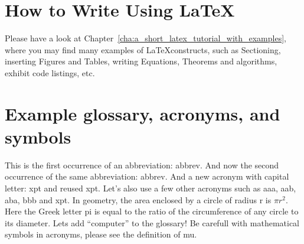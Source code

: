 \section{How to Write Using \LaTeX}
\label{sec:how_to_write_using_latex}

Please have a look at Chapter~\ref{cha:a_short_latex_tutorial_with_examples}, where you may find many examples of \LaTeX constructs, such as Sectioning, inserting Figures and Tables, writing Equations, Theorems and algorithms, exhibit code listings, etc.



\section{Example glossary, acronyms, and symbols}
%
%
This is the first occurrence of an abbreviation: \gls{abbrev}. And now the second occurrence of the same abbreviation: \gls{abbrev}. And a new acronym with capital letter: \Gls{xpt} and reused \gls{xpt}.  Let's also use a few other acronyms such as \gls{aaa}, \gls{aab}, \gls{aba}, \gls{bbb} and \gls{xpt}.
In geometry, the area enclosed by a circle of radius \gls{r} is $\pi r^2$. Here the Greek letter \gls{pi} is equal to the ratio of the circumference of any circle to its diameter.
Lets add ``\gls{computer}'' to the glossary! Be carefull with mathematical symbols in acronyms, please see the definition of \gls{mu}.


%





\endinput


\typeout{NT FILE chapter2.tex}%

\chapter{NOVAthesis Template \emph{User's Manual}}
\label{cha:users_manual}

